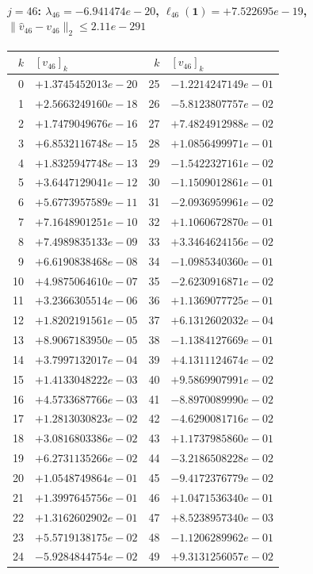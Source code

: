 \paragraph{$j = 46$: $\lambda_{46} = -6.941474e-20$, \quad $\ell_{46}(\mathbf{1}) = +7.522695e-19$, \quad $\|\hat{v}_{46} - v_{46}\|_2 \leq 2.11e-291$}
\begin{center}
{\footnotesize
\begin{tabular}{r@{\;\;}l@{\quad}r@{\;\;}l}
\toprule
$k$ & $[v_{46}]_k$ & $k$ & $[v_{46}]_k$ \\
\midrule
0 & $+1.3745452013e-20$ & 25 & $-1.2214247149e-01$ \\
1 & $+2.5663249160e-18$ & 26 & $-5.8123807757e-02$ \\
2 & $+1.7479049676e-16$ & 27 & $+7.4824912988e-02$ \\
3 & $+6.8532116748e-15$ & 28 & $+1.0856499971e-01$ \\
4 & $+1.8325947748e-13$ & 29 & $-1.5422327161e-02$ \\
5 & $+3.6447129041e-12$ & 30 & $-1.1509012861e-01$ \\
6 & $+5.6773957589e-11$ & 31 & $-2.0936959961e-02$ \\
7 & $+7.1648901251e-10$ & 32 & $+1.1060672870e-01$ \\
8 & $+7.4989835133e-09$ & 33 & $+3.3464624156e-02$ \\
9 & $+6.6190838468e-08$ & 34 & $-1.0985340360e-01$ \\
10 & $+4.9875064610e-07$ & 35 & $-2.6230916871e-02$ \\
11 & $+3.2366305514e-06$ & 36 & $+1.1369077725e-01$ \\
12 & $+1.8202191561e-05$ & 37 & $+6.1312602032e-04$ \\
13 & $+8.9067183950e-05$ & 38 & $-1.1384127669e-01$ \\
14 & $+3.7997132017e-04$ & 39 & $+4.1311124674e-02$ \\
15 & $+1.4133048222e-03$ & 40 & $+9.5869907991e-02$ \\
16 & $+4.5733687766e-03$ & 41 & $-8.8970089990e-02$ \\
17 & $+1.2813030823e-02$ & 42 & $-4.6290081716e-02$ \\
18 & $+3.0816803386e-02$ & 43 & $+1.1737985860e-01$ \\
19 & $+6.2731135266e-02$ & 44 & $-3.2186508228e-02$ \\
20 & $+1.0548749864e-01$ & 45 & $-9.4172376779e-02$ \\
21 & $+1.3997645756e-01$ & 46 & $+1.0471536340e-01$ \\
22 & $+1.3162602902e-01$ & 47 & $+8.5238957340e-03$ \\
23 & $+5.5719138175e-02$ & 48 & $-1.1206289962e-01$ \\
24 & $-5.9284844754e-02$ & 49 & $+9.3131256057e-02$ \\
\bottomrule
\end{tabular}
}
\end{center}

